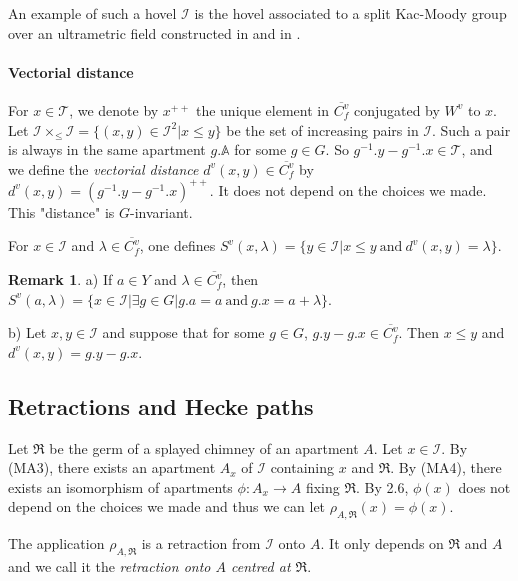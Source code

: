 \documentclass[12pt]{article}
\theoremstyle{plain}
\theoremstyle{definition}
\newtheorem{rque}[theorem]{Remark}
\newcommand{\A}{\mathbb{A}}
\newcommand{\I}{\mathcal{I}}
\begin{document}
An example of such a hovel $\I$ is the hovel associated to a split Kac-Moody group over an ultrametric field constructed in \cite{gaussent2008kac} and in \cite{rousseau2012almost}.

\paragraph{Vectorial distance}
For $x\in \mathcal{T}$, we denote by $x^{++}$ the unique element in $\overline{C^v_f}$ conjugated by $W^v$ to $x$. Let $\I\times_{\leq}\I=\{(x,y)\in \I^2|x\leq y\}$ be the set of increasing pairs in $\I$. Such a pair is always in the same apartment $g.\A$ for some $g\in G$. So $g^{-1}.y-g^{-1}.x\in \mathcal{T}$, and we define the \textit{vectorial distance} $d^v(x,y)\in\overline{C_f^v}$ by $d^v(x,y)=(g^{-1}.y-g^{-1}.x)^{++}$. It does not depend on the choices we made. This "distance" is $G$-invariant.

For $x\in \I$ and $\lambda\in \overline{C_f^v}$, one defines $S^v(x,\lambda)=\{y\in \I|x\leq y\mathrm{\ and\ }d^v(x,y)=\lambda\}$.

\begin{rque}\label{rque caractérisation distance vectorielle}
a) If $a\in Y$ and $\lambda\in \overline{C_f^v}$, then $S^v(a,\lambda)=\{x\in \I|\exists g\in G|g.a=a\mathrm{\ and\ }g.x=a+\lambda\}$.

b) Let $x,y\in \I$ and suppose that for some $g\in G$, $g.y-g.x\in \overline{C_f^v}$. Then $x\leq y$ and $d^v(x,y)=g.y-g.x$.


\end{rque}

\subsection{Retractions and Hecke paths}


Let  $\mathfrak{R}$ be the germ of a splayed chimney of an apartment $A$. Let $x\in \I$. By (MA3), there exists an apartment $A_x$ of $\I$ containing $x$ and $\mathfrak{R}$. By (MA4), there exists an isomorphism of apartments $\phi:A_x\rightarrow A$ fixing $\mathfrak{R}$. By \cite{rousseau2011masures} 2.6, $\phi(x)$ does not depend on the choices we made and thus we can let $\rho_{A,\mathfrak{R}}(x)=\phi(x)$.

The application $\rho_{A,\mathfrak{R}}$ is a retraction from $\I$ onto $A$. It only depends on $\mathfrak{R}$ and $A$ and we call it the \textit{retraction onto $A$ centred at $\mathfrak{R}$}. 
\end{document}
